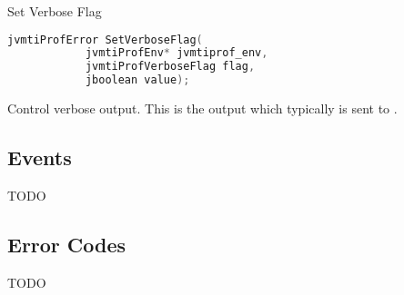 \begin{apidef}{Set Verbose Flag}
\begin{lstlisting}[language=C]
jvmtiProfError SetVerboseFlag(
            jvmtiProfEnv* jvmtiprof_env,
            jvmtiProfVerboseFlag flag,
            jboolean value);
\end{lstlisting}

\begin{apidesc}
Control verbose output. This is the output which typically is sent to .

\end{apidesc}

\begin{apiphase}
\apiphaseany
\end{apiphase}

\begin{apicap}
\apicaprequired
\end{apicap}

\begin{apiparam}
\end{apiparam}

\apireturnempty

\begin{apierror}
\end{apierror}
\end{apidef}

\subsection{Events}

TODO

\subsection{Error Codes} \label{api:ec}

TODO
